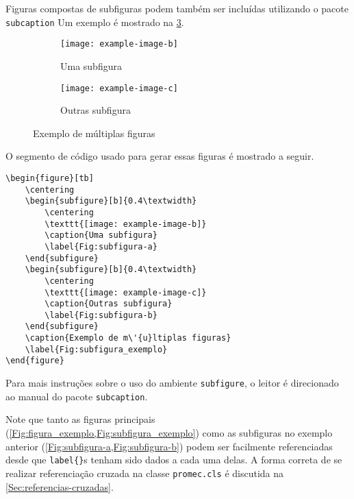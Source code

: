 Figuras compostas de subfiguras podem também ser incluídas utilizando o pacote \lstinline!subcaption! Um exemplo é mostrado na \cref{Fig:subfigura_exemplo}.
\begin{figure}[tb]
    \centering
    \begin{subfigure}[b]{0.4\textwidth}
        \centering
        \texttt{[image: example-image-b]}
        \caption{Uma subfigura}
        \label{Fig:subfigura-a}
    \end{subfigure}
    \begin{subfigure}[b]{0.4\textwidth}
        \centering
        \texttt{[image: example-image-c]}
        \caption{Outras subfigura}
        \label{Fig:subfigura-b}
    \end{subfigure}
    \caption{Exemplo de múltiplas figuras}
    \label{Fig:subfigura_exemplo}
\end{figure}
O segmento de código usado para gerar essas figuras é mostrado a seguir.
\begin{lstlisting}
\begin{figure}[tb]
    \centering
    \begin{subfigure}[b]{0.4\textwidth}
        \centering
        \texttt{[image: example-image-b]}
        \caption{Uma subfigura}
        \label{Fig:subfigura-a}
    \end{subfigure}
    \begin{subfigure}[b]{0.4\textwidth}
        \centering
        \texttt{[image: example-image-c]}
        \caption{Outras subfigura}
        \label{Fig:subfigura-b}
    \end{subfigure}
    \caption{Exemplo de m\'{u}ltiplas figuras}
    \label{Fig:subfigura_exemplo}
\end{figure}
\end{lstlisting}
Para mais instruções sobre o uso do ambiente \lstinline!subfigure!, o leitor é direcionado ao manual do pacote \lstinline!subcaption!.

Note que tanto as figuras principais (\cref{Fig:figura_exemplo,Fig:subfigura_exemplo}) como as subfiguras no exemplo anterior (\cref{Fig:subfigura-a,Fig:subfigura-b}) podem ser facilmente referenciadas desde que \lstinline!label{}!s tenham sido dados a cada uma delas. A forma correta de se realizar referenciação cruzada na classe \texttt{promec.cls} é discutida na \cref{Sec:referencias-cruzadas}.

